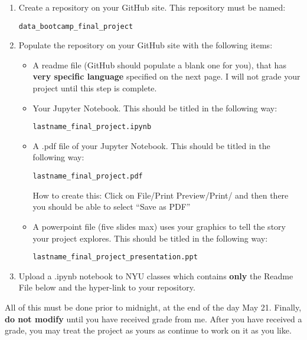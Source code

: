 \begin{enumerate}

\item Create a repository on your GitHub site. This repository must be named:

 {\tt data\_bootcamp\_final\_project}

 \bigskip

\item Populate the repository on your GitHub site with the following items:
\begin{itemize}

\item A readme file (GitHub should populate a blank one for you), that has \textbf{very specific language} specified on the next page. I will not grade your project until this step is complete.

\bigskip

\item Your Jupyter Notebook. This should be titled in the following way:

 {\tt lastname\_final\_project.ipynb}

\bigskip

\item A .pdf file of your Jupyter Notebook. This should be titled in the following way:

 {\tt lastname\_final\_project.pdf}

How to create this: Click on File/Print Preview/Print/ and then there you should be able to select ``Save as PDF''

\bigskip

\item A powerpoint file (five slides max) uses your graphics to tell the story your project explores. This should be titled in the following way:

{\tt lastname\_final\_project\_presentation.ppt}

\end{itemize}

\bigskip

\item Upload a .ipynb notebook to NYU classes which contains \textbf{only} the Readme File below and the hyper-link to your repository.

\end{enumerate}

All of this must be done prior to midnight, at the end of the day May 21. Finally, \textbf{do not modify} until you have received grade from me. After you have received a grade, you may treat the project as yours as continue to work on it as you like.

